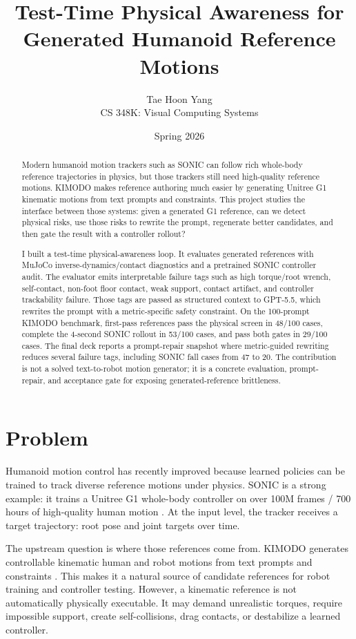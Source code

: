 \documentclass[10pt]{article}
\title{Test-Time Physical Awareness for Generated Humanoid Reference Motions}
\author{Tae Hoon Yang\\CS 348K: Visual Computing Systems}
\date{Spring 2026}
\begin{document}
\maketitle

\begin{abstract}
Modern humanoid motion trackers such as SONIC can follow rich whole-body
reference trajectories in physics, but those trackers still need high-quality
reference motions. KIMODO makes reference authoring much easier by generating
Unitree G1 kinematic motions from text prompts and constraints. This project
studies the interface between those systems: given a generated G1 reference,
can we detect physical risks, use those risks to rewrite the prompt, regenerate
better candidates, and then gate the result with a controller rollout?

I built a test-time physical-awareness loop. It evaluates generated references
with MuJoCo inverse-dynamics/contact diagnostics and a pretrained SONIC
controller audit. The evaluator emits interpretable failure tags such as high
torque/root wrench, self-contact, non-foot floor contact, weak support, contact
artifact, and controller trackability failure. Those tags are passed as
structured context to GPT-5.5, which rewrites the prompt with a metric-specific
safety constraint. On the 100-prompt KIMODO benchmark, first-pass references
pass the physical screen in 48/100 cases, complete the 4-second SONIC rollout
in 53/100 cases, and pass both gates in 29/100 cases. The final deck reports a
prompt-repair snapshot where metric-guided rewriting reduces several failure
tags, including SONIC fall cases from 47 to 20. The contribution is not a
solved text-to-robot motion generator; it is a concrete evaluation,
prompt-repair, and acceptance gate for exposing generated-reference brittleness.
\end{abstract}

\section{Problem}

Humanoid motion control has recently improved because learned policies can be
trained to track diverse reference motions under physics. SONIC is a strong
example: it trains a Unitree G1 whole-body controller on over 100M frames / 700
hours of high-quality human motion \cite{sonic}. At the input level, the
tracker receives a target trajectory: root pose and joint targets over time.

The upstream question is where those references come from. KIMODO generates
controllable kinematic human and robot motions from text prompts and
constraints \cite{kimodo}. This makes it a natural source of candidate
references for robot training and controller testing. However, a kinematic
reference is not automatically physically executable. It may demand unrealistic
torques, require impossible support, create self-collisions, drag contacts, or
destabilize a learned controller.
\end{document}
